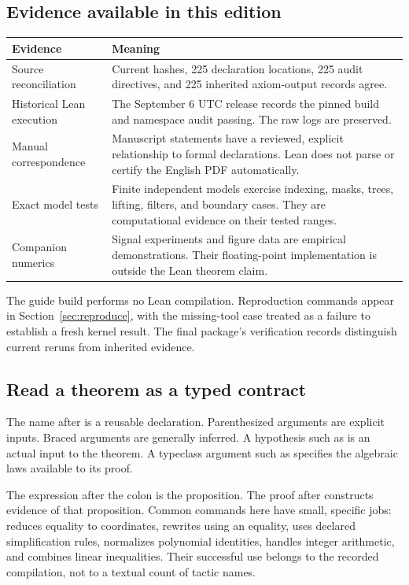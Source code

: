\subsection{Evidence available in this edition}
\begin{longtable}{>{\raggedright\arraybackslash}p{}>{\raggedright\arraybackslash}p{}}
\toprule Evidence & Meaning \\ \midrule\endhead
Source reconciliation & Current hashes, 225 declaration locations, 225 audit directives, and 225 inherited axiom-output records agree. \\ \addlinespace
Historical Lean execution & The September 6 UTC release records the pinned build and namespace audit passing. The raw logs are preserved. \\ \addlinespace
Manual correspondence & Manuscript statements have a reviewed, explicit relationship to formal declarations. Lean does not parse or certify the English PDF automatically. \\ \addlinespace
Exact model tests & Finite independent models exercise indexing, masks, trees, lifting, filters, and boundary cases. They are computational evidence on their tested ranges. \\ \addlinespace
Companion numerics & Signal experiments and figure data are empirical demonstrations. Their floating-point implementation is outside the Lean theorem claim. \\ \bottomrule
\end{longtable}
The guide build performs no Lean compilation. Reproduction commands appear in Section~\ref{sec:reproduce}, with the missing-tool case treated as a failure to establish a fresh kernel result. The final package's verification records distinguish current reruns from inherited evidence.

\subsection{Read a theorem as a typed contract}
The name after  is a reusable declaration. Parenthesized arguments are explicit inputs. Braced arguments are generally inferred. A hypothesis such as  is an actual input to the theorem. A typeclass argument such as \code{[AddCommMonoid E]} specifies the algebraic laws available to its proof.

The expression after the colon is the proposition. The proof after  constructs evidence of that proposition. Common commands here have small, specific jobs:  reduces equality to coordinates,  rewrites using an equality,  uses declared simplification rules,  normalizes polynomial identities,  handles integer arithmetic, and  combines linear inequalities. Their successful use belongs to the recorded compilation, not to a textual count of tactic names.

